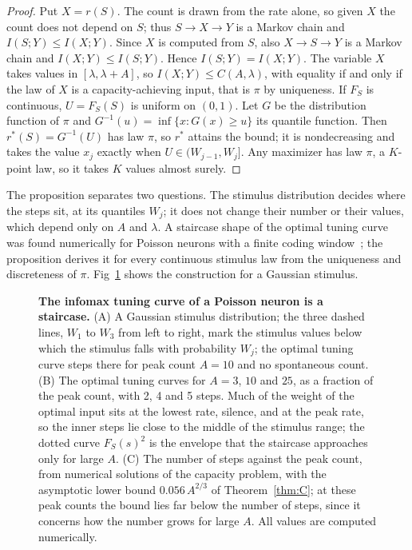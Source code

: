 \documentclass[10pt,letterpaper]{article}
\begin{document}
\begin{proof}
Put $X=r(S)$. The count is drawn from the rate alone, so given $X$ the count does not depend on $S$; thus $S\to X\to Y$ is a Markov
chain and $I(S;Y)\le I(X;Y)$. Since $X$ is computed from $S$, also $X\to S\to Y$ is a Markov chain and $I(X;Y)\le I(S;Y)$. Hence
$I(S;Y)=I(X;Y)$. The variable $X$ takes values in $[\lambda,\lambda+A]$, so $I(X;Y)\le C(A,\lambda)$, with equality if and only if the
law of $X$ is a capacity-achieving input, that is $\pi$ by uniqueness. If $F_S$ is continuous, $U=F_S(S)$ is uniform on $(0,1)$. Let
$G$ be the distribution function of $\pi$ and $G^{-1}(u)=\inf\{x:G(x)\ge u\}$ its quantile function. Then $r^*(S)=G^{-1}(U)$ has law $\pi$, so $r^*$ attains
the bound; it is nondecreasing and takes the value $x_j$ exactly when $U\in(W_{j-1},W_j]$. Any maximizer has law $\pi$, a $K$-point
law, so it takes $K$ values almost surely.
\end{proof}

The proposition separates two questions. The stimulus distribution decides where the steps sit, at its quantiles $W_j$; it does not
change their number or their values, which depend only on $A$ and $\lambda$. A staircase shape of the optimal tuning curve was found
numerically for Poisson neurons with a finite coding window~\cite{Nikitin2009}; the proposition derives it for every continuous
stimulus law from the uniqueness and discreteness of $\pi$. Fig~\ref{fig:schematic} shows the construction for a Gaussian stimulus.

\begin{figure}[!h]
\centering
\caption{\textbf{The infomax tuning curve of a Poisson neuron is a staircase.} (A) A Gaussian stimulus distribution; the three dashed
lines, $W_1$ to $W_3$ from left to right, mark the stimulus values below which the stimulus falls with probability $W_j$; the optimal tuning curve steps
there for peak count $A=10$ and no spontaneous count. (B) The optimal tuning
curves for $A=3$, $10$ and $25$, as a fraction of the peak count, with 2, 4 and 5 steps. Much of the weight of the optimal input sits at the lowest rate,
silence, and at the peak rate, so the inner steps lie close to the middle of the stimulus range; the dotted curve $F_S(s)^2$ is the envelope
that the staircase approaches only for large $A$. (C) The number of steps against the peak count, from numerical solutions of the
capacity problem, with the asymptotic lower bound $0.056\,A^{2/3}$ of Theorem~\ref{thm:C}; at these peak counts the bound lies far
below the number of steps, since it concerns how the number grows for large $A$. All values are computed numerically.}\label{fig:schematic}
\end{figure}
\end{document}
